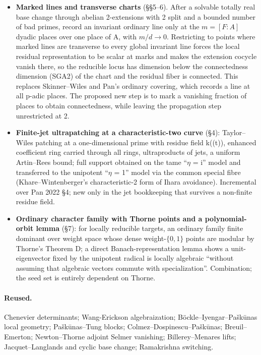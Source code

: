 \documentclass[11pt]{article}
\begin{document}
\begin{itemize}
\item \textbf{Marked lines and transverse charts} (\S{}\S{}5--6). After a solvable totally real base change through abelian 2-extensions with 2 split and a bounded number of bad primes, record an invariant ordinary line only at the $m=[F:A]$ dyadic places over one place of A, with $m/d\to0$. Restricting to points where marked lines are transverse to every global invariant line forces the local residual representation to be scalar at marks and makes the extension cocycle vanish there, so the reducible locus has dimension below the connectedness dimension (SGA2) of the chart and the residual fiber is connected. This replaces Skinner--Wiles and Pan's ordinary covering, which records a line at all p-adic places. The proposed new step is to mark a vanishing fraction of places to obtain connectedness, while leaving the propagation step unrestricted at 2.
\item \textbf{Finite-jet ultrapatching at a characteristic-two curve} (\S{}4): Taylor--Wiles patching at a one-dimensional prime with residue field k((t)), enhanced coefficient ring carried through all rings, ultraproducts of jets, a uniform Artin--Rees bound; full support obtained on the tame ``$\eta$ = i'' model and transferred to the unipotent ``$\eta$ = 1'' model via the common special fibre (Khare--Wintenberger's characteristic-2 form of Ihara avoidance). Incremental over Pan 2022 \S{}4; new only in the jet bookkeeping that survives a non-finite residue field.
\item \textbf{Ordinary character family with Thorne points and a polynomial-orbit lemma} (\S{}7): for locally reducible targets, an ordinary family finite dominant over weight space whose dense weight-$\{0,1\}$ points are modular by Thorne's Theorem D; a direct Banach-representation lemma shows a unit-eigenvector fixed by the unipotent radical is locally algebraic ``without assuming that algebraic vectors commute with specialization''. Combination; the seed set is entirely dependent on Thorne.
\end{itemize}

\paragraph{Reused.}

Chenevier determinants; Wang-Erickson algebraization; Böckle--Iyengar--Pa\v{s}k\={u}nas local geometry; Pa\v{s}k\={u}nas--Tung blocks; Colmez--Dospinescu--Pa\v{s}k\={u}nas; Breuil--Emerton; Newton--Thorne adjoint Selmer vanishing; Billerey--Menares lifts; Jacquet--Langlands and cyclic base change; Ramakrishna switching.
\end{document}
